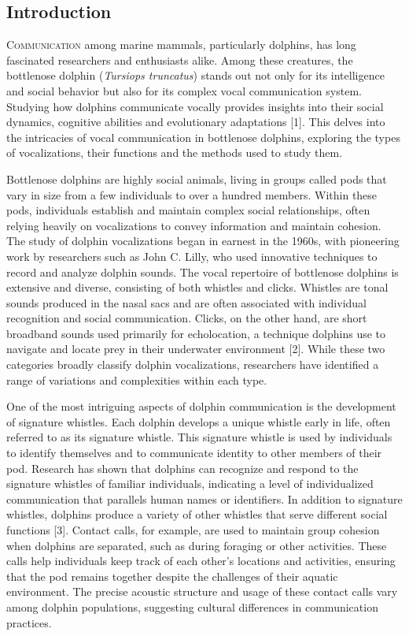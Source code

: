 \documentclass{article}
\begin{document}
\begin{multicols}{2}
\fontsize{9}{10.8}\selectfont\color{color_29791}

\section*{\color{color_100238}Introduction}
\lettrine[lines=2, findent=3pt, nindent=0pt]{C}{ommunication} among marine mammals, particularly dolphins, has long fascinated researchers and enthusiasts alike. Among these creatures, the bottlenose dolphin (\textit{Tursiops truncatus}) stands out not only for its intelligence and social behavior but also for its complex vocal communication system. Studying how dolphins communicate vocally provides insights into their social dynamics, cognitive abilities and evolutionary adaptations [1]. This delves into the intricacies of vocal communication in bottlenose dolphins, exploring the types of vocalizations, their functions and the methods used to study them.

Bottlenose dolphins are highly social animals, living in groups called pods that vary in size from a few individuals to over a hundred members. Within these pods, individuals establish and maintain complex social relationships, often relying heavily on vocalizations to convey information and maintain cohesion. The study of dolphin vocalizations began in earnest in the 1960s, with pioneering work by researchers such as John C. Lilly, who used innovative techniques to record and analyze dolphin sounds. The vocal repertoire of bottlenose dolphins is extensive and diverse, consisting of both whistles and clicks. Whistles are tonal sounds produced in the nasal sacs and are often associated with individual recognition and social communication. Clicks, on the other hand, are short broadband sounds used primarily for echolocation, a technique dolphins use to navigate and locate prey in their underwater environment [2]. While these two categories broadly classify dolphin vocalizations, researchers have identified a range of variations and complexities within each type.

One of the most intriguing aspects of dolphin communication is the development of signature whistles. Each dolphin develops a unique whistle early in life, often referred to as its signature whistle. This signature whistle is used by individuals to identify themselves and to communicate identity to other members of their pod. Research has shown that dolphins can recognize and respond to the signature whistles of familiar individuals, indicating a level of individualized communication that parallels human names or identifiers. In addition to signature whistles, dolphins produce a variety of other whistles that serve different social functions [3]. Contact calls, for example, are used to maintain group cohesion when dolphins are separated, such as during foraging or other activities. These calls help individuals keep track of each other's locations and activities, ensuring that the pod remains together despite the challenges of their aquatic environment. The precise acoustic structure and usage of these contact calls vary among dolphin populations, suggesting cultural differences in communication practices.


\end{multicols}
\end{document}
